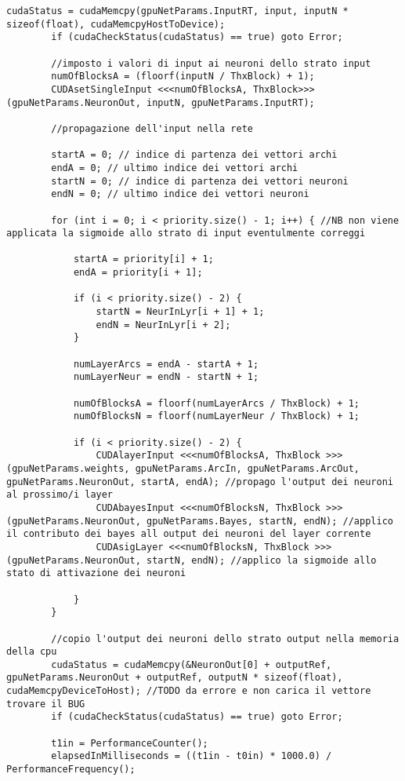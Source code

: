 \documentclass[10pt,a4paper]{article}
\begin{document}
\begin{lstlisting}[style=mycuda, caption=librerie usate, captionpos=b]
		cudaStatus = cudaMemcpy(gpuNetParams.InputRT, input, inputN * sizeof(float), cudaMemcpyHostToDevice);
		if (cudaCheckStatus(cudaStatus) == true) goto Error;

		//imposto i valori di input ai neuroni dello strato input
		numOfBlocksA = (floorf(inputN / ThxBlock) + 1);
		CUDAsetSingleInput <<<numOfBlocksA, ThxBlock>>> (gpuNetParams.NeuronOut, inputN, gpuNetParams.InputRT);
		
		//propagazione dell'input nella rete

		startA = 0; // indice di partenza dei vettori archi
		endA = 0; // ultimo indice dei vettori archi
		startN = 0; // indice di partenza dei vettori neuroni
		endN = 0; // ultimo indice dei vettori neuroni

		for (int i = 0; i < priority.size() - 1; i++) { //NB non viene applicata la sigmoide allo strato di input eventulmente correggi

			startA = priority[i] + 1;
			endA = priority[i + 1];

			if (i < priority.size() - 2) {
				startN = NeurInLyr[i + 1] + 1;
				endN = NeurInLyr[i + 2];
			}

			numLayerArcs = endA - startA + 1;
			numLayerNeur = endN - startN + 1;

			numOfBlocksA = floorf(numLayerArcs / ThxBlock) + 1;
			numOfBlocksN = floorf(numLayerNeur / ThxBlock) + 1;

			if (i < priority.size() - 2) {
				CUDAlayerInput <<<numOfBlocksA, ThxBlock >>> (gpuNetParams.weights, gpuNetParams.ArcIn, gpuNetParams.ArcOut, gpuNetParams.NeuronOut, startA, endA); //propago l'output dei neuroni al prossimo/i layer
				CUDAbayesInput <<<numOfBlocksN, ThxBlock >>> (gpuNetParams.NeuronOut, gpuNetParams.Bayes, startN, endN); //applico il contributo dei bayes all output dei neuroni del layer corrente 
				CUDAsigLayer <<<numOfBlocksN, ThxBlock >>> (gpuNetParams.NeuronOut, startN, endN); //applico la sigmoide allo stato di attivazione dei neuroni
				
			}
		}

		//copio l'output dei neuroni dello strato output nella memoria della cpu
		cudaStatus = cudaMemcpy(&NeuronOut[0] + outputRef, gpuNetParams.NeuronOut + outputRef, outputN * sizeof(float), cudaMemcpyDeviceToHost); //TODO da errore e non carica il vettore trovare il BUG
		if (cudaCheckStatus(cudaStatus) == true) goto Error;
			
		t1in = PerformanceCounter();
		elapsedInMilliseconds = ((t1in - t0in) * 1000.0) / PerformanceFrequency();


\end{lstlisting}
\end{document}
